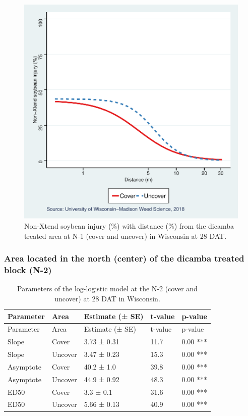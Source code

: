 \documentclass[]{article}
\begin{document}
\begin{figure}
\centering
\includegraphics{Report_Dicamba_study_files/figure-latex/unnamed-chunk-95-1.pdf}
\caption{Non-Xtend soybean injury (\%) with distance (\%) from the
dicamba treated area at N-1 (cover and uncover) in Wisconsin at 28 DAT.}
\end{figure}

\pagebreak

\subsubsection{Area located in the north (center) of the dicamba treated
block
(N-2)}\label{area-located-in-the-north-center-of-the-dicamba-treated-block-n-2}

\begin{longtable}[]{@{}lllll@{}}
\caption{Parameters of the log-logistic model at the N-2 (cover and
uncover) at 28 DAT in Wisconsin.}\tabularnewline
\toprule
Parameter & Area & Estimate (± SE) & t-value & p-value\tabularnewline
\midrule
\endfirsthead
\toprule
Parameter & Area & Estimate (± SE) & t-value & p-value\tabularnewline
\midrule
\endhead
Slope & Cover & 3.73 ± 0.31 & 11.7 & 0.00 ***\tabularnewline
Slope & Uncover & 3.47 ± 0.23 & 15.3 & 0.00 ***\tabularnewline
Asymptote & Cover & 40.2 ± 1.0 & 39.8 & 0.00 ***\tabularnewline
Asymptote & Uncover & 44.9 ± 0.92 & 48.3 & 0.00 ***\tabularnewline
ED50 & Cover & 3.3 ± 0.1 & 31.6 & 0.00 ***\tabularnewline
ED50 & Uncover & 5.66 ± 0.13 & 40.9 & 0.00 ***\tabularnewline
\bottomrule
\end{longtable}
\end{document}
